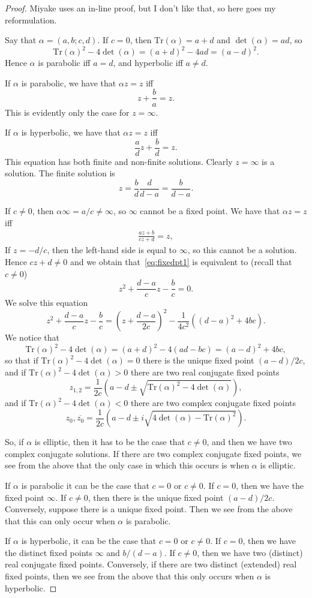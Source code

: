 \documentclass{article}
\theoremstyle{definition}
\begin{document}
\begin{proof}
	Miyake uses an in-line proof, but I don't like that, so here goes my reformulation.

	Say that $\alpha=(a,b;c,d)$. If $c=0$, then $\mathrm{Tr}(\alpha)=a+d$ and $\det(\alpha)=ad$, so
	\[\mathrm{Tr}(\alpha)^2-4\det(\alpha)=(a+d)^2-4ad=(a-d)^2.\]
	Hence $\alpha$ is parabolic iff $a=d$, and hyperbolic iff $a\neq d$.

	If $\alpha$ is parabolic, we have that $\alpha z=z$ iff
	\[z+\frac{b}{a}=z.\]
	This is evidently only the case for $z=\infty$.

	If $\alpha$ is hyperbolic, we have that $\alpha z=z$ iff
	\[\frac{a}{d}z+\frac{b}{d}=z.\]
	This equation has both finite and non-finite solutions. Clearly $z=\infty$ is a solution. The finite solution is
	\[z=\frac{b}{d}\frac{d}{d-a}=\frac{b}{d-a}.\]

	If $c\neq 0$, then $\alpha\infty=a/c\neq\infty$, so $\infty$ cannot be a fixed point. We have that $\alpha z=z$ iff
	\begin{align}
		\frac{az+b}{cz+d}=z,
		\label{eq:fixedpt1}
	\end{align}
	If $z=-d/c$, then the left-hand side is equal to $\infty$, so this cannot be a solution. Hence $cz+d\neq 0$ and we obtain that~\eqref{eq:fixedpt1} is equivalent to (recall that $c\neq 0$)
	\[z^2+\frac{d-a}{c}z-\frac{b}{c}=0.\]
	We solve this equation
	\[z^2+\frac{d-a}{c}z-\frac{b}{c}=(z+\frac{d-a}{2c})^2-\frac{1}{4c^2}((d-a)^2+4bc).\]
	We notice that
	\[\mathrm{Tr}(\alpha)^2-4\det(\alpha)=(a+d)^2-4(ad-bc)=(a-d)^2+4bc,\]
	so that if $\mathrm{Tr}(\alpha)^2-4\det(\alpha)=0$ there is the unique fixed point $(a-d)/2c$, and if $\mathrm{Tr}(\alpha)^2-4\det(\alpha)>0$ there are two real conjugate fixed points
	\[z_{1,2}=\frac{1}{2c}(a-d\pm\sqrt{\mathrm{Tr}(\alpha)^2-4\det(\alpha)}),\]
	and if $\mathrm{Tr}(\alpha)^2-4\det(\alpha)<0$ there are two complex conjugate fixed points
	\[z_0,\overline{z_0}=\frac{1}{2c}(a-d\pm i\sqrt{4\det(\alpha)-\mathrm{Tr}(\alpha)^2}).\]

	So, if $\alpha$ is elliptic, then it has to be the case that $c\neq 0$, and then we have two complex conjugate solutions. If there are two complex conjugate fixed points, we see from the above that the only case in which this occurs is when $\alpha$ is elliptic.

	If $\alpha$ is parabolic it can be the case that $c=0$ or $c\neq 0$. If $c=0$, then we have the fixed point $\infty$. If $c\neq 0$, then there is the unique fixed point $(a-d)/2c$. Conversely, suppose there is a unique fixed point. Then we see from the above that this can only occur when $\alpha$ is parabolic.

	If $\alpha$ is hyperbolic, it can be the case that $c=0$ or $c\neq 0$. If $c=0$, then we have the distinct fixed points $\infty$ and $b/(d-a)$. If $c\neq 0$, then we have two (distinct) real conjugate fixed points. Conversely, if there are two distinct (extended) real fixed points, then we see from the above that this only occurs when $\alpha$ is hyperbolic.
\end{proof}
\end{document}
